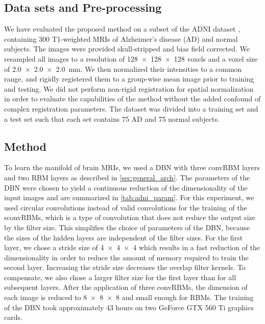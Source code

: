 \subsection{Data sets and Pre-processing}

We have evaluated the proposed method on a subset of the ADNI dataset
\citep{petersen2010}, containing 300 T1-weighted MRIs of Alzheimer's disease
(AD) and normal subjects. The images were provided skull-stripped and bias field
corrected. We resampled all images to a resolution of \num{128x128x128} voxels
and a voxel size of \SI{2.0x2.0x2.0}{\milli\meter}. We then normalized their
intensities to a common range, and rigidly registered them to a group-wise mean
image prior to training and testing. We did not perform non-rigid registration
for spatial normalization in order to evaluate the capabilities of the method
without the added confound of complex registration parameters. The dataset was
divided into a training set and a test set such that each set contains 75 AD and
75 normal subjects.

\subsection{Method}

To learn the manifold of brain MRIs, we used a DBN with three convRBM layers and
two RBM layers as described in \ref{sec:general_arch}. The parameters of the DBN
were chosen to yield a continuous reduction of the dimensionality of the input
images and are summarized in \ref{tab:adni_param}. For this experiment, we used
circular convolutions instead of valid convolutions for the training of the
sconvRBMs, which is a type of convolution that does not reduce the output size
by the filter size. This simplifies the choice of parameters of the DBN, because
the sizes of the hidden layers are independent of the filter sizes. For the
first layer, we chose a stride size of \num{4x4x4} which results in a fast
reduction of the dimensionality in order to reduce the amount of memory required
to train the second layer. Increasing the stride size decreases the overlap
filter kernels. To compensate, we also chose a larger filter size for the first
layer than for all subsequent layers. After the application of three convRBMs,
the dimension of each image is reduced to \num{8x8x8} and small enough for RBMs.
The training of the DBN took approximately 43 hours on two GeForce GTX 560 Ti
graphics cards.



